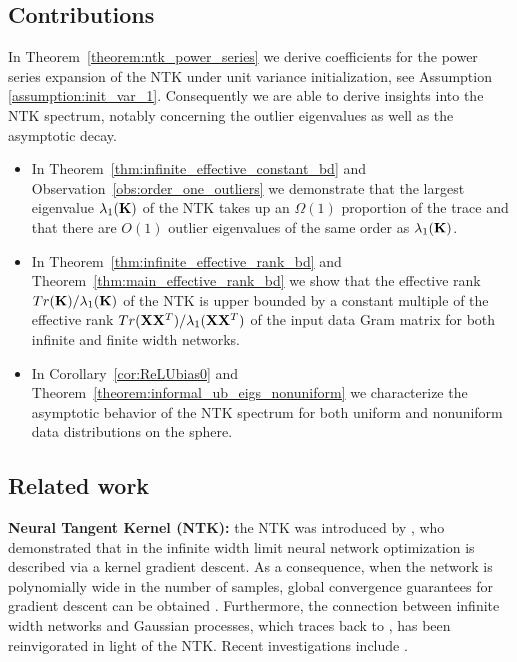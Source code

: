 \subsection{Contributions} 
    In Theorem~\ref{theorem:ntk_power_series} we derive coefficients for the power series expansion of the NTK under unit variance initialization, see Assumption \ref{assumption:init_var_1}. Consequently we are able to derive insights into the NTK spectrum, notably concerning the outlier eigenvalues as well as the asymptotic decay. 
\begin{itemize}[leftmargin=*] 
    \item In Theorem~\ref{thm:infinite_effective_constant_bd} and Observation~\ref{obs:order_one_outliers} we demonstrate that the largest eigenvalue $\lambda_1(\mathbf{K})$ of the NTK takes up an $\Omega(1)$ proportion of the trace and that there are $O(1)$ outlier eigenvalues of the same order as $\lambda_1(\mathbf{K})$. 
    \item In Theorem~\ref{thm:infinite_effective_rank_bd} and Theorem~\ref{thm:main_effective_rank_bd} we show that the effective rank $Tr(\mathbf{K}) / \lambda_1(\mathbf{K})$ of the NTK is upper bounded by a constant multiple of the effective rank $Tr(\mathbf{X} \mathbf{X}^T) / \lambda_1(\mathbf{X} \mathbf{X}^T)$ of the input data Gram matrix for both infinite and finite width networks.  
    \item In Corollary~\ref{cor:ReLUbias0} and Theorem~\ref{theorem:informal_ub_eigs_nonuniform} we characterize the asymptotic behavior of the NTK spectrum for both uniform and nonuniform data distributions on the sphere. 
\end{itemize}

\subsection{Related work}
\textbf{Neural Tangent Kernel (NTK):} the NTK was introduced by \cite{jacot_ntk}, who demonstrated that in the infinite width limit neural network optimization is described via a kernel gradient descent.  As a consequence, when the network is polynomially wide in the number of samples, global convergence guarantees for gradient descent can be obtained \citep{du2019gradient,du2018gradient,allenzhu2019convergence, zou2019improved,Lee2019WideNN-SHORT,zou2020gradient,solt_mod_over,marco,nguyenrelu}. Furthermore, the connection between infinite width networks and Gaussian processes, which traces back to \cite{neal1996}, has been reinvigorated in light of the NTK. Recent investigations include  \cite{LeeBNSPS18,matthews2018gaussian,bayesianconv}. 

